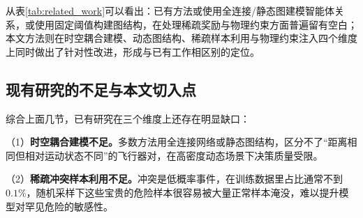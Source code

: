 \documentclass[12pt,a4paper,UTF8]{ctexart}
\begin{document}
\begin{table}[H]
    \centering
    \caption{本文方法与代表性相关工作的系统性对比}
    \label{tab:related_work}
\end{table}

从表\ref{tab:related_work}可以看出：已有方法或使用全连接/静态图建模智能体关系，或使用固定阈值构建图结构，在处理稀疏奖励与物理约束方面普遍留有空白；本文方法则在时空耦合建模、动态图结构、稀疏样本利用与物理约束注入四个维度上同时做出了针对性改进，形成与已有工作相区别的定位。

\subsection{现有研究的不足与本文切入点}

综合上面几节，已有研究在三个维度上还存在明显缺口：

（1）\textbf{时空耦合建模不足。}多数方法用全连接网络或静态图结构\cite{ref8,ref10,ref11}，区分不了“距离相同但相对运动状态不同”的飞行器对，在高密度动态场景下决策质量受限。

（2）\textbf{稀疏冲突样本利用不足。}冲突是低概率事件，在训练数据里占比通常不到$0.1\%$\cite{ref12,ref13}，随机采样下这些宝贵的危险样本很容易被大量正常样本淹没，难以提升模型对罕见危险的敏感性。
\end{document}
